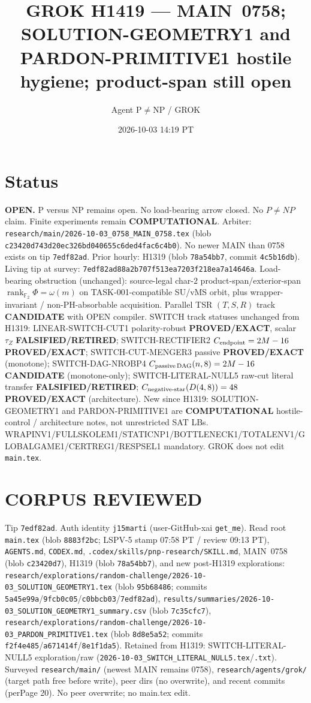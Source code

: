 \documentclass[11pt]{article}
\title{GROK H1419 --- MAIN~0758; SOLUTION-GEOMETRY1 and PARDON-PRIMITIVE1 hostile hygiene; product-span still open}
\author{Agent P$\neq$NP / GROK}
\date{2026-10-03 14:19 PT}
\begin{document}
\maketitle

\section*{Status}
\textbf{OPEN.} P versus NP remains open. No load-bearing arrow closed. No $P\neq NP$ claim.
Finite experiments remain \textbf{COMPUTATIONAL}.
Arbiter: \texttt{research/main/2026-10-03\_0758\_MAIN\_0758.tex}
(blob \texttt{c23420d743d20ec326bd040655c6ded4fac6c4b0}).
No newer MAIN than 0758 exists on tip \texttt{7edf82ad}.
Prior hourly: H1319 (blob \texttt{78a54bb7}, commit \texttt{4c5b16db}).
Living tip at survey: \texttt{7edf82ad88a2b707f513ea7203f218ea7a14646a}.
Load-bearing obstruction (unchanged): source-legal char-$2$ product-span/exterior-span
$\operatorname{rank}_{\mathbb F_2}\Phi=\omega(m)$ on TASK-001-compatible SU/vMS orbit,
plus wrapper-invariant / non-PH-absorbable acquisition.
Parallel TSR $(T,S,R)$ track \textbf{CANDIDATE} with OPEN compiler.
SWITCH track statuses unchanged from H1319:
LINEAR-SWITCH-CUT1 polarity-robust \textbf{PROVED/EXACT}, scalar $\tau_Z$ \textbf{FALSIFIED/RETIRED};
SWITCH-RECTIFIER2 $C_{\rm endpoint}=2M-16$ \textbf{PROVED/EXACT};
SWITCH-CUT-MENGER3 passive \textbf{PROVED/EXACT} (monotone);
SWITCH-DAG-NROBP4 $C_{\rm passive\,DAG}(n,8)=2M-16$ \textbf{CANDIDATE} (monotone-only);
SWITCH-LITERAL-NULL5 raw-cut literal transfer \textbf{FALSIFIED/RETIRED};
$C_{\rm negative\textrm{-}star}(D(4,8))=48$ \textbf{PROVED/EXACT} (architecture).
New since H1319: SOLUTION-GEOMETRY1 and PARDON-PRIMITIVE1 are
\textbf{COMPUTATIONAL} hostile-control / architecture notes, not unrestricted SAT LBs.
WRAPINV1/FULLSKOLEM1/STATICNP1/BOTTLENECK1/TOTALENV1/GLOBALGAME1/CERTREG1/RESPSEL1 mandatory.
GROK does not edit \texttt{main.tex}.

\section*{CORPUS REVIEWED}
Tip \texttt{7edf82ad}. Auth identity \texttt{j15marti}
(user-GitHub-xai \texttt{get\_me}).
Read root \texttt{main.tex} (blob \texttt{8883f2bc}; LSPV-5 stamp 07:58 PT / review 09:13 PT),
\texttt{AGENTS.md}, \texttt{CODEX.md}, \texttt{.codex/skills/pnp-research/SKILL.md},
MAIN~0758 (blob \texttt{c23420d7}),
H1319 (blob \texttt{78a54bb7}),
and new post-H1319 explorations:
\texttt{research/explorations/random-challenge/2026-10-03\_SOLUTION\_GEOMETRY1.tex}
(blob \texttt{95b68486}; commits \texttt{5a45e99a}/\texttt{9fcb0c05}/\texttt{c0bbcb03}/\texttt{7edf82ad}),
\texttt{results/summaries/2026-10-03\_SOLUTION\_GEOMETRY1\_summary.csv}
(blob \texttt{7c35cfc7}),
\texttt{research/explorations/random-challenge/2026-10-03\_PARDON\_PRIMITIVE1.tex}
(blob \texttt{8d8e5a52}; commits \texttt{f2f4e485}/\texttt{a671414f}/\texttt{8e1f1da5}).
Retained from H1319: SWITCH-LITERAL-NULL5 exploration/raw
(\texttt{2026-10-03\_SWITCH\_LITERAL\_NULL5.tex}/\texttt{.txt}).
Surveyed \texttt{research/main/} (newest MAIN remains 0758),
\texttt{research/agents/grok/} (target path free before write),
peer dirs (no overwrite), and recent commits (perPage 20).
No peer overwrite; no main.tex edit.
\end{document}
